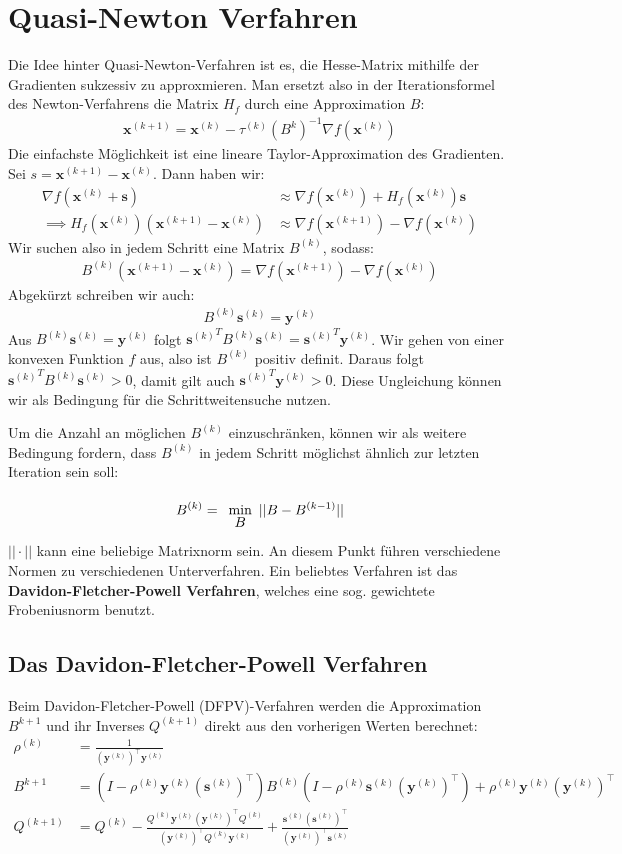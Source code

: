 \documentclass{report}
\newcommand{\tbf}{\textbf}
\renewcommand{\min}[1] {
    \begin{array}{c}
        \vphantom{#1}\\[-3pt] %
        \text{min}\\[-3pt]
        #1\\
        \end{array}
    }
\newcommand{\xk}{\bm{x}^{(k)}}
\newcommand{\yk}{\bm{y}^{(k)}}
\newcommand{\sk}{\bm{s}^{(k)}}
\newcommand{\tauk}{\tau^{(k)}}
\newcommand{\rhok}{\rho^{(k)}}
\newcommand{\Bk}{B^{(k)}}
\newcommand{\Qk}{Q^{(k)}}
\newcommand*{\newpar}{\par\vspace{\baselineskip}\noindent}
\begin{document}
\section{Quasi-Newton Verfahren}
Die Idee hinter Quasi-Newton-Verfahren ist es, die Hesse-Matrix mithilfe der Gradienten sukzessiv zu approxmieren. Man ersetzt also in der Iterationsformel des Newton-Verfahrens die Matrix $H_f$ durch eine Approximation $B$:
\begin{align*}
 \bm{x}^{(k+1)} = \xk - \tauk (B^k)^{-1} \nabla f(\xk)
\end{align*}
Die einfachste Möglichkeit ist eine lineare Taylor-Approximation des Gradienten. Sei $s = \bm{x}^{(k+1)} - \xk$. Dann haben wir:
\begin{align*}
 \nabla f(\xk + \bm{s}) &\approx \nabla f(\xk) + H_f(\xk)\bm{s}\\
 \implies H_f(\xk)(\bm{x}^{(k+1)} - \xk) &\approx \nabla f(\bm{x}^{(k+1)}) - \nabla f(\xk)
\end{align*}
Wir suchen also in jedem Schritt eine Matrix $\Bk$, sodass:
\begin{align}
 \Bk (\bm{x}^{(k+1)} - \xk) = \nabla f(\bm{x}^{(k+1)}) - \nabla f(\xk)
\end{align}
Abgekürzt schreiben wir auch:
\begin{align*}
 \Bk \sk = \yk
\end{align*}
Aus $\Bk \sk = \yk$ folgt ${\sk}^T\Bk \sk = {\sk}^T\yk$. Wir gehen von einer konvexen Funktion $f$ aus, also ist $\Bk$ positiv definit. Daraus folgt ${\sk}^T\Bk \sk > 0$, damit gilt auch ${\sk}^T\yk > 0$. Diese Ungleichung können wir als Bedingung für die Schrittweitensuche nutzen.
\newpar
Um die Anzahl an möglichen $\Bk$ einzuschränken, können wir als weitere Bedingung fordern, dass $\Bk$ in jedem Schritt möglichst ähnlich zur letzten Iteration sein soll:
\begin{align*}
 \Bk = \min{B} ||B - B^{(k-1)}||
\end{align*}
$||\cdot||$ kann eine beliebige Matrixnorm sein. An diesem Punkt führen verschiedene Normen zu verschiedenen Unterverfahren. Ein beliebtes Verfahren ist das \tbf{Davidon-Fletcher-Powell Verfahren}, welches eine sog. gewichtete Frobeniusnorm benutzt.
\subsection{Das Davidon-Fletcher-Powell Verfahren}
Beim Davidon-Fletcher-Powell (DFPV)-Verfahren werden die Approximation $B^{k+1}$ und ihr Inverses $Q^{(k+1)}$ direkt aus den vorherigen Werten berechnet:
\begin{align*}
 \rhok &= \frac{1}{(\yk)^\top \yk}\\
 B^{k+1} &= (I - \rhok \yk (\sk)^\top) \Bk (I - \rhok \sk (\yk)^\top) + \rhok \yk (\yk)^\top\\
 Q^{(k+1)} &= \Qk - \frac{\Qk \yk (\yk)^\top \Qk}{(\yk)^\top \Qk \yk} + \frac{\sk (\sk)^\top}{(\yk)^\top \sk}
\end{align*}
\end{document}
